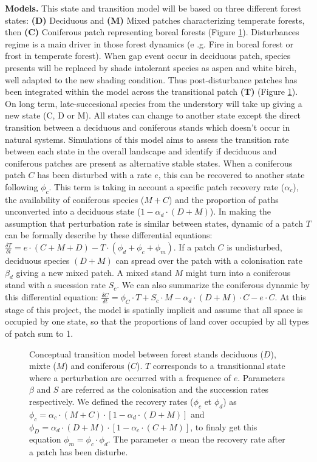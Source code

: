 \textbf{Models.} This state and transition model will be based on three
different forest states: \textbf{(D)} Deciduous and \textbf{(M)} Mixed patches
characterizing temperate forests, then \textbf{(C)} Coniferous patch
representing boreal forests (Figure \ref{Model}). Disturbances regime is a main
driver in those forest dynamics (e .g. Fire in boreal forest or frost in
temperate forest). When gap event occur in deciduous patch, species presents
will be replaced by shade intolerant species as aspen and white birch, well
adapted to the new shading condition. Thus post-disturbance patches has been
integrated within the model across the transitional patch \textbf{(T)} (Figure
\ref{Model}).  On long term, late-succesional species from the understory will
take up giving a new state (C, D or M). All states can change to another state
except the direct transition between a deciduous and coniferous stands which
doesn't occur in natural systems. Simulations of this model aims to assess the
transition rate between each state in the overall landscape and identify if
deciduous and coniferous patches are present as alternative stable states. When
a coniferous patch $C$ has been disturbed with a rate $e$, this can be recovered
to another state following $\phi_c$. This term is taking in account a specific
patch recovery rate ($\alpha_{c}$), the availability of coniferous species
($M+C$) and the proportion of paths unconverted into a deciduous state ($1-
\alpha_d \cdot (D +M)$). In making the assumption that perturbation rate is
similar between states, dynamic of a patch $T$ can be formally describe by these
differential equations: $\frac{\delta T}{\delta t} = e \cdot (C+M+D) - T \cdot
(\phi_d + \phi_c + \phi_m)$. If a patch $C$ is undisturbed, deciduous species
$(D+M)$ can spread over the patch with a colonisation rate $\beta_d$ giving a
new mixed patch. A mixed stand $M$ might turn into a coniferous stand with a
sucession rate $S_c$.  We can also summarize the coniferous dynamic by this
differential equation: $\frac{\delta C}{\delta t} = \phi_C \cdot T + S_c \cdot M
- \alpha_d \cdot (D+M)\cdot C - e \cdot C$. At this stage of this project, the
model is spatially implicit and assume that all space is occupied by one state,
so that the proportions of land cover occupied by all types of patch sum to 1.
\\

\begin{figure}         
	
	\caption{Conceptual transition model between forest stands deciduous ($D$),
	mixte ($M$) and coniferous ($C$). $T$ corresponds to a transitionnal state
	where a perturbation are occurred with a frequence of $e$. Parameters $\beta$
	and $S$ are referred as the colonisation and the succession rates
	respectively. We defined the recovery rates ($\phi_c$ et $\phi_d$) as $\phi_c
	= \alpha_c \cdot (M+C) \cdot [1- \alpha_d \cdot (D +M)]$ and $\phi_D =
	\alpha_d \cdot (D+M) \cdot [1- \alpha_c \cdot (C +M)]$, to finaly get this
	equation $\phi_m = \phi_c \cdot \phi_d$. The parameter $\alpha$ mean the
	recovery rate after a patch has been disturbe.}         
	\label{Model}
\end{figure}


